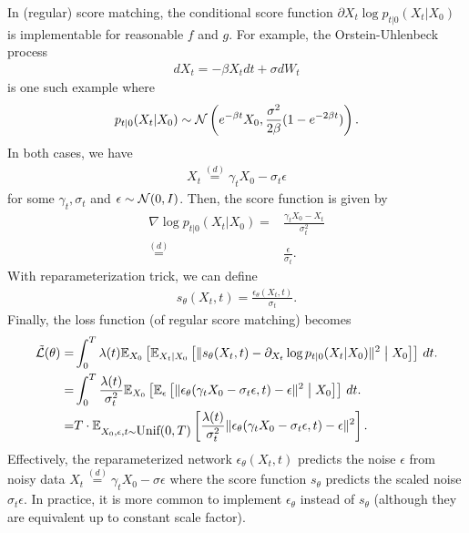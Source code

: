 \documentclass[11pt, a4paper]{article}
\begin{document}
In (regular) score matching, the conditional score function $\partial{X_t} \log p_{t|0}(X_t|X_0)$ is implementable for reasonable $f$ and $g$.
For example, the Orstein-Uhlenbeck process
\begin{align}
    dX_t = -\beta X_t dt + \sigma dW_t
\end{align}
is one such example where
\begin{align}
    p_{t|0} (X_t|X_0) \sim {\cal N}\left( e^{-\beta t}X_0, \frac{\sigma^2}{2\beta} (1-e^{-2\beta t})\right).
\end{align}
In both cases, we have
\begin{align}
    X_t \stackrel{(d)}{=} \gamma_t X_0 - \sigma_t \epsilon
\end{align}
for some $\gamma_t, \sigma_t$ and $\epsilon\sim {\cal N}(0, I)$.
Then, the score function is given by
\begin{align}
    \nabla \log p_{t|0}(X_t|X_0) =& \frac{\gamma_t X_0 - X_t}{\sigma_t^2}\\
    \stackrel{(d)}{=}& \frac{\epsilon}{\sigma_t}.
\end{align}
With reparameterization trick, we can define
\begin{align}
    s_{\theta}(X_t, t) = \frac{\epsilon_\theta(X_t, t)}{\sigma_t}.
\end{align}
Finally, the loss function (of regular score matching) becomes
    \begin{align}
        \tilde{\cL}(\theta) 
        =& \int_{0}^T \lambda(t) \fE_{X_0}\left[\fE_{X_t|X_0}\left[ \| s_\theta(X_t, t)  - \partial_{X_t} \log p_{t|0}(X_t|X_0)\|^2 \suchthat X_0\right]\right]\, dt.\\
        =& \int_{0}^T \frac{\lambda(t)}{\sigma_t^2} \fE_{X_0}\left[\fE_{\epsilon}\left[ \| \epsilon_\theta(\gamma_tX_0 - \sigma_t\epsilon, t) - \epsilon\|^2 \suchthat X_0\right]\right]\, dt.\\
        =& T\cdot  \fE_{X_0, \epsilon, t\sim\mbox{Unif$(0,T)$}}\left[\frac{\lambda(t)}{\sigma_t^2} \| \epsilon_\theta(\gamma_tX_0 - \sigma_t\epsilon, t) - \epsilon\|^2 \right].
    \end{align}
Effectively, the reparameterized network $\epsilon_\theta(X_t, t)$ predicts the noise $\epsilon$ from noisy data $X_t \stackrel{(d)}{=} \gamma_t X_0 - \sigma \epsilon$
where the score function $s_\theta$ predicts the scaled noise $\sigma_t\epsilon$.
In practice, it is more common to implement $\epsilon_\theta$ instead of $s_\theta$ (although they are equivalent up to constant scale factor).
\end{document}
